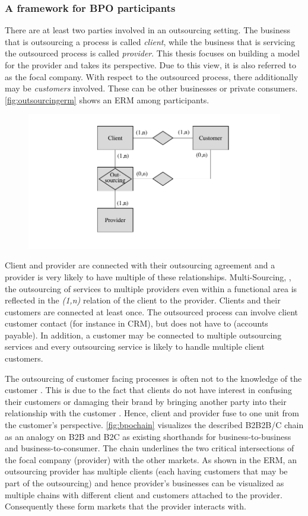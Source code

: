 		\subsubsection{A framework for BPO participants}
	There are at least two parties involved in an outsourcing setting. The business that is outsourcing a process is called \textit{client}, while the business that is servicing the outsourced process is called \textit{provider}. This thesis focuses on building a model for the provider and takes its perspective. Due to this view, it is also referred to as the focal company. With respect to the outsourced process, there additionally may be \textit{customers} involved. These can be other businesses or private consumers.  \ref{fig:outsourcingerm} shows an ERM among participants. 
			\begin{figure}[caption={Outsourcing ERM}, label={fig:outsourcingERM}]
		{	\includegraphics[width=.8\textwidth]{figures/outsourcingERM.pdf}}
	\end{figure}
	
	Client and provider are connected with their outsourcing agreement and a provider is very likely to have multiple of these relationships. Multi-Sourcing, \ie, the outsourcing of services to multiple providers even within a functional area is reflected in the \textit{(1,n)} relation of the client to the provider. Clients and their customers are connected at least once. The outsourced process can involve client customer contact (for instance in CRM), but does not have to (accounts payable). In addition, a customer may be connected to multiple outsourcing services and every outsourcing service is likely to handle multiple client customers. 
	
	The outsourcing of customer facing processes is often not to the knowledge of the customer . This is due to the fact that clients do not have interest in confusing their customers or damaging their brand by bringing another party into their relationship with the customer . Hence, client and provider fuse to one unit from the customer's perspective.  \ref{fig:bpochain} visualizes the described B2B2B/C chain as an analogy on B2B and B2C as existing shorthands for business-to-business and business-to-consumer. The chain underlines the two critical intersections of the focal company (provider) with the other markets. As shown in the ERM, an outsourcing provider has multiple clients (each having customers that may be part of the outsourcing) and hence provider's businesses can be visualized as multiple chains with different client and customers attached to the provider. Consequently these form markets that the provider interacts with.
	
